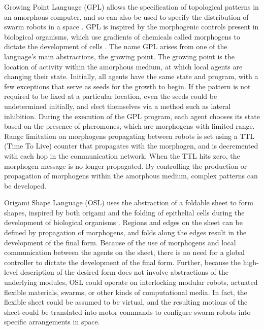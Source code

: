 \documentclass[]{article}
\begin{document}
Growing Point Language (GPL) allows the specification of topological patterns in an amorphous computer, and so can also be used to specify the distribution of swarm robots in a space \cite{nagpal2004engineering}. 
GPL is inspired by the morphogenic controls present in biological organisms, which use gradients of chemicals called morphogens to dictate the development of cells \cite{turing1952chemical}.
The name GPL arises from one of the language's main abstractions, the growing point. 
The growing point is the location of activity within the amorphous medium, at which local agents are changing their state. 
Initially, all agents have the same state and program, with a few exceptions that serve as seeds for the growth to begin. 
If the pattern is not required to be fixed at a particular location, even the seeds could be undetermined initially, and elect themselves via a method such as lateral inhibition. 
During the execution of the GPL program, each agent chooses its state based on the presence of pheromones, which are morphogens with limited range. 
Range limitation on morphogens propagating between robots is set using a TTL (Time To Live) counter that propagates with the morphogen, and is decremented with each hop in the communication network. 
When the TTL hits zero, the morphogen message is no longer propagated. 
By controlling the production or propagation of morphogens within the amorphous medium, complex patterns can be developed. 

Origami Shape Language (OSL) uses the abstraction of a foldable sheet to form shapes, inspired by both origami and the folding of epithelial cells during the development of biological organisms \cite{nagpal2004engineering, nagpal2001programmable}.
Regions and edges on the sheet can be defined by propagation of morphogens, and folds along the edges result in the development of the final form.
Because of the use of morphogens and local communication between the agents on the sheet, there is no need for a global controller to dictate the development of the final form. 
Further, because the high-level description of the desired form does not involve abstractions of the underlying modules, OSL could operate on interlocking modular robots, actuated flexible materials, swarms, or other kinds of computational media. 
In fact, the flexible sheet could be assumed to be virtual, and the resulting motions of the sheet could be translated into motor commands to configure swarm robots into specific arrangements in space. 
\end{document}
